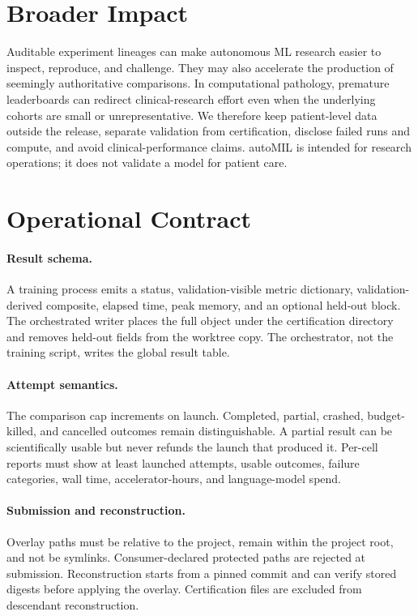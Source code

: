 \documentclass{article}
\newcommand{\ours}{\textsf{autoMIL}\xspace}
\begin{document}
\section*{Broader Impact}

Auditable experiment lineages can make autonomous ML research easier to inspect,
reproduce, and challenge.  They may also accelerate the production of
seemingly authoritative comparisons.  In computational pathology, premature
leaderboards can redirect clinical-research effort even when the underlying
cohorts are small or unrepresentative.  We therefore keep patient-level data
outside the release, separate validation from certification, disclose failed
runs and compute, and avoid clinical-performance claims.  \ours is intended for
research operations; it does not validate a model for patient care.




\clearpage
\appendix

\section{Operational Contract}
\label{app:contract}

\paragraph{Result schema.}
A training process emits a status, validation-visible metric dictionary,
validation-derived composite, elapsed time, peak memory, and an optional
held-out block.  The orchestrated writer places the full object under the
certification directory and removes held-out fields from the worktree copy.
The orchestrator, not the training script, writes the global result table.

\paragraph{Attempt semantics.}
The comparison cap increments on launch.  Completed, partial, crashed,
budget-killed, and cancelled outcomes remain distinguishable.  A partial
result can be scientifically usable but never refunds the launch that produced
it.  Per-cell reports must show at least launched attempts, usable outcomes,
failure categories, wall time, accelerator-hours, and language-model spend.

\paragraph{Submission and reconstruction.}
Overlay paths must be relative to the project, remain within the project root,
and not be symlinks.  Consumer-declared protected paths are rejected at
submission.  Reconstruction starts from a pinned commit and can verify stored
digests before applying the overlay.  Certification files are excluded from
descendant reconstruction.
\end{document}
